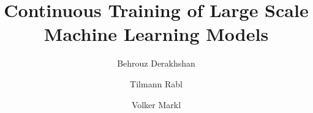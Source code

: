 \documentclass{vldb}
\begin{document}





%

\title{Continuous Training of Large Scale Machine Learning Models}

%
%
%
%
%


\renewcommand\Authfont{\fontsize{13}{14.4}\selectfont \bfseries }
\renewcommand\Affilfont{\fontsize{10}{14.4}\selectfont \normalfont}

\author[1]{Behrouz Derakhshan}
\author[1,2]{Tilmann Rabl}
\author[1,2]{Volker Markl}


\end{document}
